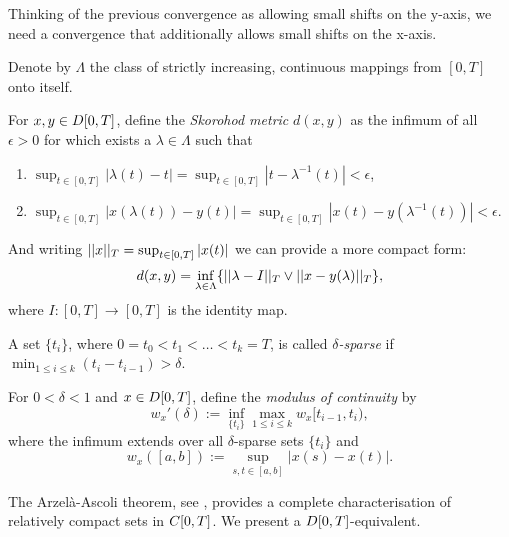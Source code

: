 Thinking of the previous convergence as allowing small shifts on the y-axis,
we need a convergence that additionally allows small shifts on the x-axis.

\begin{definition} \label{D: skorohod}
	Denote by $\Lambda$ the class of strictly increasing, continuous mappings from $[0,T]$ onto itself.
	
	For $x, y \in D[0, T]$, define the \emph{Skorohod metric} $d(x,y)$ as the infimum of all $\epsilon > 0$ 
	for which exists a $\lambda \in \Lambda$ such that
	\begin{enumerate}
		\item $\sup_{t \in [0,T]}|\lambda (t) - t| = \sup_{t \in [0,T]}|t - \lambda^{-1}(t)| < \epsilon$,
		\item  $\sup_{t \in [0,T]}|x(\lambda (t)) - y(t)| = \sup_{t \in [0,T]}|x(t) - y(\lambda^{-1}(t))| < \epsilon$.
	\end{enumerate}
	And writing $||x||_T = \sup_{t \in [0,T]}|x(t)|$ we can provide a more compact form:
	\begin{equation}
		d(x,y) = \inf_{\lambda \in \Lambda}\{ ||\lambda - I||_T \vee ||x - y(\lambda)||_T \},
	\end{equation}
	where $I:[0,T] \rightarrow [0,T]$ is the identity map.
\end{definition}

\begin{definition} \label{D: modulus of continuity}
	A set $\{t_i\}$, where $ 0 = t_0 < t_1 < \dots < t_k = T $,
	is called \emph{$\delta$-sparse} if $\min_{1\leq i \leq k} (t_i - t_{i-1}) > \delta$.
	
	For $0 < \delta < 1$ and $x \in D[0, T]$, define the \emph{modulus of continuity} by
	\begin{equation*}
		w_x'(\delta) := \inf_{\{t_i\}} \max_{1\leq i \leq k} w_x[t_{i-1}, t_i),
	\end{equation*}
	where the infimum extends over all $\delta$-sparse sets $\{t_i\}$ and
	\begin{equation*}
		w_x([a,b]) := \sup_{s,t \in [a,b]}|x(s)  -x(t)|.
	\end{equation*}
\end{definition}

The Arzelà-Ascoli theorem, see \cite[Theorem 7.2, p.82]{Billingsley.1999},
provides a complete characterisation of relatively compact sets in $C[0, T]$.
We present a $D[0, T]$-equivalent.

